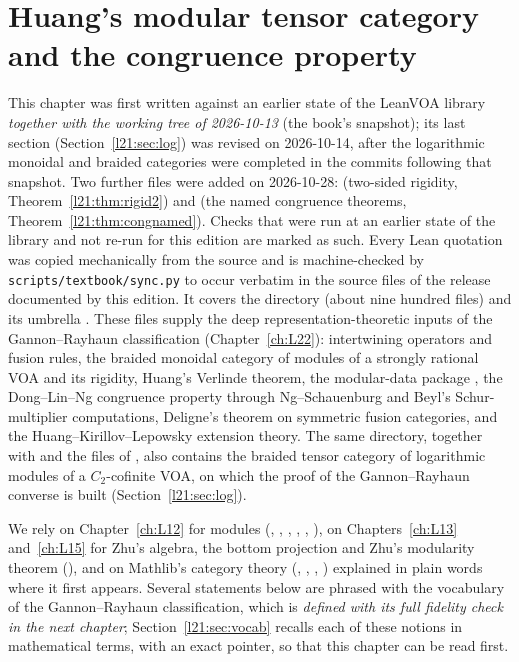 \chapter{Huang's modular tensor category and the congruence property}\label{ch:L21}
\begingroup\setlength{\emergencystretch}{3em}\sloppy

\providecommand{\ltwooneSL}{\mathrm{SL}_2}
\providecommand{\ltwooneRep}{\operatorname{Rep}}

This chapter was first written against an earlier state of the LeanVOA library \emph{together with the
working tree of 2026-10-13} (the book's snapshot); its last section (Section~\ref{l21:sec:log}) was revised
on 2026-10-14, after the logarithmic monoidal and braided categories were completed in the
commits following that snapshot. Two further files were added on 2026-10-28:
 (two-sided rigidity, Theorem~\ref{l21:thm:rigid2}) and
 (the named congruence theorems,
Theorem~\ref{l21:thm:congnamed}). Checks that were run at an earlier state of the library and not re-run for this
edition are marked as such. Every Lean quotation was copied mechanically from the source and is
machine-checked by \texttt{scripts/textbook/sync.py} to occur verbatim in the source files of the release documented by this edition. It covers the directory
 (about nine hundred files) and its umbrella .
These files supply the deep representation-theoretic inputs of the Gannon--Rayhaun classification
(Chapter~\ref{ch:L22}): intertwining operators and fusion rules, the braided monoidal category of modules of a
strongly rational VOA and its rigidity, Huang's Verlinde theorem, the modular-data package , the
Dong--Lin--Ng congruence property through Ng--Schauenburg and Beyl's Schur-multiplier computations, Deligne's
theorem on symmetric fusion categories, and the Huang--Kirillov--Lepowsky extension theory. The same directory, together
with  and the  files of
, also contains the braided tensor category of logarithmic modules of
a $C_2$-cofinite VOA, on which the proof of the Gannon--Rayhaun converse is built (Section~\ref{l21:sec:log}).

We rely on Chapter~\ref{ch:L12} for modules (, , ,
, , ), on Chapters~\ref{ch:L13} and~\ref{ch:L15} for
Zhu's algebra, the bottom projection  and Zhu's modularity theorem
(), and on Mathlib's category theory (, ,
, ) explained in plain words where it first appears. Several statements below
are phrased with the vocabulary of the Gannon--Rayhaun classification, which is \emph{defined with its full fidelity
check in the next chapter}; Section~\ref{l21:sec:vocab} recalls each of these notions in mathematical terms, with
an exact pointer, so that this chapter can be read first.

